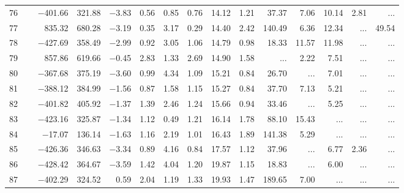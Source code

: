 \begin{table*}[p]
{\begin{tabular}{l@{ }r@{ \ }rr@{ \ }rr@{ \ }rrrr@{ \ }r@{ \ }r@{ \ }r@{ \ }r}
76   \ \dotfill \  &  $-$401.66 &    321.88 &  $-$3.83 &   0.56 &    0.85 &   0.76 &   14.12 &   1.21&       37.37 &        7.06 &       10.14 &        2.81 &    ...       \\     
 77   \ \dotfill \  &    835.32 &    680.28 &  $-$3.19 &   0.35 &    3.17 &   0.29&   14.40 &   2.42&      140.49 &        6.36 &       12.34 &    ...     &       49.54   \\     
78   \ \dotfill \  &  $-$427.69 &    358.49 &  $-$2.99 &   0.92 &    3.05 &   1.06&   14.79 &   0.98 &       18.33 &       11.57 &       11.98 &    ...     &    ...       \\     
 79   \ \dotfill \  &    857.86 &    619.66 &  $-$0.45 &   2.83 &    1.33 &   2.69&   14.90 &   1.58&    ...     &        2.22 &        7.51 &    ...     &    ...       \\     
 80   \ \dotfill \  &  $-$367.68 &    375.19 &  $-$3.60 &   0.99 &    4.34 &   1.09&   15.21 &   0.84&       26.70 &    ...     &        7.01 &    ...     &    ...       \\     
 81   \ \dotfill \  &  $-$388.12 &    384.99 &  $-$1.56 &   0.87 &    1.58 &   1.15&   15.27 &   0.84&       37.70 &        7.13 &        5.21 &    ...     &    ...       \\     
 82   \ \dotfill \  &  $-$401.82 &    405.92 &  $-$1.37 &   1.39 &    2.46 &   1.24&   15.66 &   0.94&       33.46 &    ...     &        5.25 &    ...     &    ...       \\     
 83   \ \dotfill \  &  $-$423.16 &    325.87 &  $-$1.34 &   1.12 &    0.49 &   1.21&   16.14 &   1.78 &       88.10 &       15.43 &    ...     &    ...     &    ...       \\     
 84   \ \dotfill \  &   $-$17.07 &    136.14 &  $-$1.63 &   1.16 &    2.19 &   1.01&   16.43 &   1.89&      141.38 &        5.29 &    ...     &    ...     &    ...       \\     
 85   \ \dotfill \  &  $-$426.36 &    346.63 &  $-$3.34 &   0.89 &    4.16 &   0.84&   17.57 &   1.12&       37.96 &    ...     &        6.77 &        2.36 &    ...       \\     
 86   \ \dotfill \  &  $-$428.42 &    364.67 &  $-$3.59 &   1.42 &    4.04 &   1.20&   19.87 &   1.15&       18.83 &    ...     &        6.00 &    ...     &    ...       \\     
 87   \ \dotfill \  &  $-$402.29 &    324.52 &    0.59 &   2.04 &    1.19 &   1.33&   19.93 &   1.47&      189.65 &        7.00 &    ...     &    ...     &    ...       \\     

\end{tabular}}
\end{table*}

